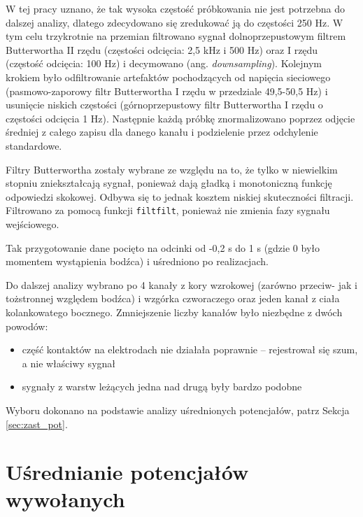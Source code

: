 \documentclass{pracamgr}
\begin{document}
	W tej pracy uznano, że tak wysoka częstość próbkowania nie jest potrzebna do dalszej analizy, dlatego zdecydowano się zredukować ją do częstości 250 Hz. W tym celu trzykrotnie na przemian filtrowano sygnał dolnoprzepustowym filtrem Butterwortha II rzędu (częstości odcięcia: 2,5 kHz i 500 Hz) oraz I rzędu (częstość odcięcia: 100 Hz) i decymowano (ang. \textit{downsampling}). Kolejnym krokiem było odfiltrowanie artefaktów pochodzących od napięcia sieciowego (pasmowo-zaporowy filtr Butterwortha I rzędu w przedziale 49,5-50,5 Hz) i usunięcie niskich częstości (górnoprzepustowy filtr Butterwortha I rzędu o częstości odcięcia 1 Hz). Następnie każdą próbkę znormalizowano poprzez odjęcie średniej z całego zapisu dla danego kanału i podzielenie przez odchylenie standardowe.
	
	Filtry Butterwortha zostały wybrane ze względu na to, że tylko w niewielkim stopniu zniekształcają sygnał, ponieważ dają gładką i monotoniczną funkcję odpowiedzi skokowej. Odbywa się to jednak kosztem niskiej skuteczności filtracji. Filtrowano za pomocą funkcji \texttt{filtfilt}, ponieważ nie zmienia fazy sygnału wejściowego.
	
	Tak przygotowanie dane pocięto na odcinki od -0,2 s do 1 s (gdzie 0 było momentem wystąpienia bodźca) i uśredniono po realizacjach.
	
	Do dalszej analizy wybrano po 4 kanały z kory wzrokowej (zarówno przeciw- jak i tożstronnej względem bodźca) i wzgórka czworaczego oraz jeden kanał z ciała kolankowatego bocznego. Zmniejszenie liczby kanałów było niezbędne z dwóch powodów:
	\begin{itemize}
		\item część kontaktów na elektrodach nie działała poprawnie -- rejestrował się szum, a nie właściwy sygnał
		\item sygnały z warstw leżących jedna nad drugą były bardzo podobne
	\end{itemize}
	Wyboru dokonano na podstawie analizy uśrednionych potencjałów, patrz Sekcja \ref{sec:zast_pot}.
	\section{Uśrednianie potencjałów wywołanych}
\end{document}
